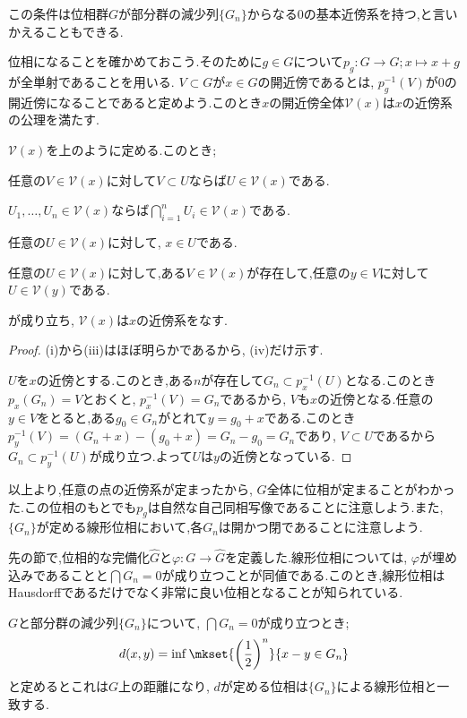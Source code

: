 この条件は位相群$G$が部分群の減少列$\{G_n\}$からなる$0$の基本近傍系を持つ,と言いかえることもできる.

位相になることを確かめておこう.そのために$g\in G$について$p_g:G\to G;x\mapsto x+g$が全単射であることを用いる. $V\subset G$が$x\in G$の開近傍であるとは, $p_g^{-1}(V)$が$0$の開近傍になることであると定めよう.このとき$x$の開近傍全体$\mathcal{V}(x)$は$x$の近傍系の公理を満たす.

\begin{lem}
	$\mathcal{V}(x)$を上のように定める.このとき;
	\begin{sakura}
		\item 任意の$V\in\mathcal{V}(x)$に対して$V\subset U$ならば$U\in\mathcal{V}(x)$である.
		\item $U_1,\dots,U_n\in\mathcal{V}(x)$ならば$\bigcap_{i=1}^n U_i\in\mathcal{V}(x)$である.
		\item 任意の$U\in\mathcal{V}(x)$に対して, $x\in U$である.
		\item 任意の$U\in\mathcal{V}(x)$に対して,ある$V\in\mathcal{V}(x)$が存在して,任意の$y\in V$に対して$U\in\mathcal{V}(y)$である.
	\end{sakura}
	が成り立ち, $\mathcal{V}(x)$は$x$の近傍系をなす.
\end{lem}

\begin{proof}
	(i)から(iii)はほぼ明らかであるから, (iv)だけ示す.
	
	$U$を$x$の近傍とする.このとき,ある$n$が存在して$G_n\subset p_x^{-1}(U)$となる.このとき$p_x(G_n)=V$とおくと, $p_x^{-1}(V)=G_n$であるから, $V$も$x$の近傍となる.任意の$y\in V$をとると,ある$g_0\in G_n$がとれて$y=g_0+x$である.このとき$p_y^{-1}(V)=(G_n+x)-(g_0+x)=G_n-g_0=G_n$であり, $V\subset U$であるから$G_n\subset p_y^{-1}(U)$が成り立つ.よって$U$は$y$の近傍となっている.
\end{proof}

以上より,任意の点の近傍系が定まったから, $G$全体に位相が定まることがわかった.この位相のもとでも$p_g$は自然な自己同相写像であることに注意しよう.また, $\{G_n\}$が定める線形位相において,各$G_n$は開かつ閉であることに注意しよう.

先の節で,位相的な完備化$\widehat{G}$と$\varphi:G\to\widehat{G}$を定義した.線形位相については, $\varphi$が埋め込みであることと$\bigcap G_n=0$が成り立つことが同値である.このとき,線形位相はHausdorffであるだけでなく非常に良い位相となることが知られている.

\begin{prop}
	$G$と部分群の減少列$\{G_n\}$について, $\bigcap G_n=0$が成り立つとき;
	\[d(x,y)=\inf\mkset{\left(\frac{1}{2}\right)^n}{x-y\in G_n}\]
	と定めるとこれは$G$上の距離になり, $d$が定める位相は$\{G_n\}$による線形位相と一致する.
\end{prop}

